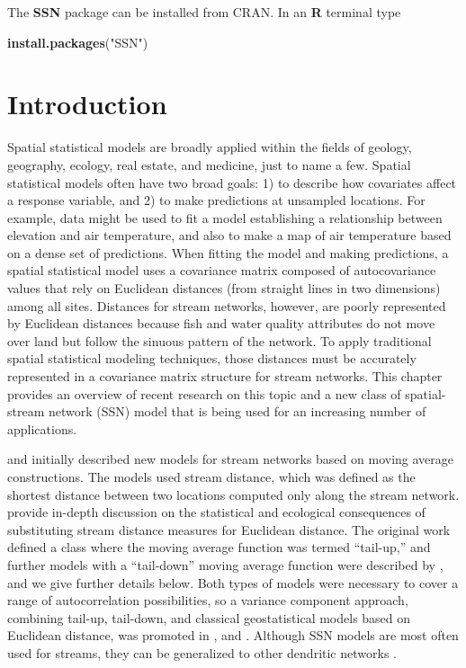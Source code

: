 \documentclass[]{book}
\newenvironment{Shaded}{\begin{snugshade}}{\end{snugshade}}
\newcommand{\KeywordTok}[1]{\textcolor[rgb]{0.13,0.29,0.53}{\textbf{#1}}}
\newcommand{\NormalTok}[1]{#1}
\newcommand{\StringTok}[1]{\textcolor[rgb]{0.31,0.60,0.02}{#1}}
\theoremstyle{definition}
\theoremstyle{definition}
\theoremstyle{definition}
\theoremstyle{remark}
\begin{document}
The \textbf{SSN} package can be installed from CRAN. In an \textbf{R}
terminal type

\begin{Shaded}
\begin{Highlighting}[]
\KeywordTok{install.packages}\NormalTok{(}\StringTok{"SSN"}\NormalTok{)}
\end{Highlighting}
\end{Shaded}

\hypertarget{intro}{%
\chapter{Introduction}\label{intro}}

Spatial statistical models are broadly applied within the fields of
geology, geography, ecology, real estate, and medicine, just to name a
few. Spatial statistical models often have two broad goals: 1) to
describe how covariates affect a response variable, and 2) to make
predictions at unsampled locations. For example, data might be used to
fit a model establishing a relationship between elevation and air
temperature, and also to make a map of air temperature based on a dense
set of predictions. When fitting the model and making predictions, a
spatial statistical model uses a covariance matrix composed of
autocovariance values that rely on Euclidean distances (from straight
lines in two dimensions) among all sites. Distances for stream networks,
however, are poorly represented by Euclidean distances because fish and
water quality attributes do not move over land but follow the sinuous
pattern of the network. To apply traditional spatial statistical
modeling techniques, those distances must be accurately represented in a
covariance matrix structure for stream networks. This chapter provides
an overview of recent research on this topic and a new class of
spatial-stream network (SSN) model that is being used for an increasing
number of applications.

\citet{Ver:Pete:Theo:spat:2006} and
\citet{Cres:Frey:Harc:Smit:spat:2006} initially described new models for
stream networks based on moving average constructions. The models used
stream distance, which was defined as the shortest distance between two
locations computed only along the stream network.
\citep{Pete:Theo:Ver:supp:2007} provide in-depth discussion on the
statistical and ecological consequences of substituting stream distance
measures for Euclidean distance. The original work defined a class where
the moving average function was termed ``tail-up,'' and further models
with a ``tail-down'' moving average function were described by
\citep{Ver:Pete:Move:2010}, and we give further details below. Both
types of models were necessary to cover a range of autocorrelation
possibilities, so a variance component approach, combining tail-up,
tail-down, and classical geostatistical models based on Euclidean
distance, was promoted in \citet{Garr:Mone:Ver:spat:2009},
\citet{Pete:Ver:mixe:2010} and \citet{Ver:Pete:Move:2010}. Although SSN
models are most often used for streams, they can be generalized to other
dendritic networks \citep{Pete:Ver:Isaa:stre:2013}.
\end{document}
